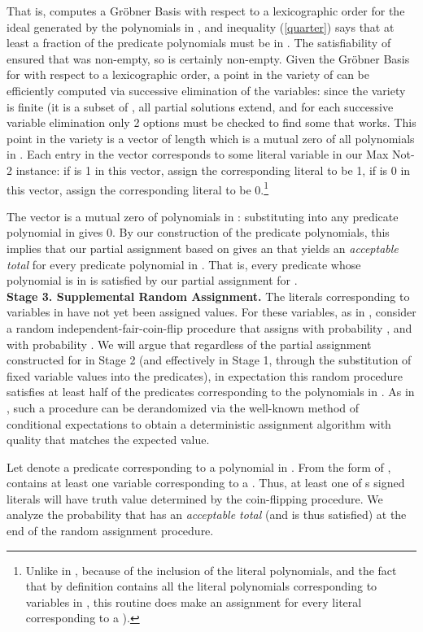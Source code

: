 \documentclass{article}
\begin{document}
That is,  computes a Gr\"{o}bner Basis with respect to a lexicographic order for the ideal generated by the polynomials in , and inequality (\ref{quarter}) says that at least a  fraction of the predicate polynomials must be in . The satisfiability of  ensured that  was non-empty, so  is certainly non-empty.
Given the Gr\"{o}bner Basis for  with respect to a lexicographic order, a point in the variety of  can be efficiently computed via successive elimination of the variables: since the variety is finite (it is a subset of , all partial solutions extend, and for each successive variable elimination only 2 options must be checked to find some  that works. This point in the variety is a vector  of length  which is a mutual zero of all polynomials in . Each entry in the vector corresponds to some literal variable in our Max Not-2 instance: if  is 1 in this vector, assign the corresponding literal  to be 1, if  is 0 in this vector, assign the corresponding literal  to be 0.\footnote{Unlike in \citep{RS}, because of the inclusion of the literal polynomials, and the fact that by definition  contains all the literal polynomials corresponding to variables in , this routine does make an assignment for every literal  corresponding to a  ).} 

The vector  is a mutual zero of polynomials in : substituting  into any predicate polynomial
in  gives 0. By our construction of the predicate polynomials, this implies that our partial assignment based on  gives an  that yields an \textit{acceptable total} for every predicate polynomial in . That is, every predicate whose polynomial is in  is satisfied by our partial assignment for .\\

\noindent \textbf{Stage 3. Supplemental Random Assignment.} The literals corresponding to variables in  have not yet been assigned values. For these variables, as in \citep{RS}, consider a random independent-fair-coin-flip procedure that assigns  with probability , and  with probability . We will argue that regardless of the partial assignment constructed for  in Stage 2 (and effectively in Stage 1, through the substitution of fixed variable values into the predicates), in expectation this random procedure satisfies at least half of the predicates corresponding to the polynomials in . As in \citep{RS}, such a procedure can be derandomized via the well-known method of conditional expectations to obtain a deterministic assignment algorithm with quality that matches the expected value.

Let  denote a predicate corresponding to a polynomial in . From the form of ,  contains at least one variable corresponding to a . Thus, at least one of s signed literals will have truth value determined by the coin-flipping procedure. We analyze the probability that  has an \textit{acceptable total} (and is thus satisfied) at the end of the random assignment procedure. 
\end{document}
